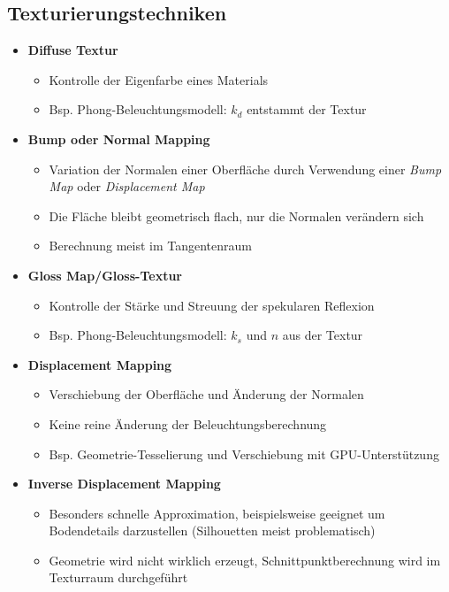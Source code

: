 \subsection{Texturierungstechniken}
\begin{itemize}
	\item \textbf{Diffuse Textur}
	\begin{itemize}
		\item Kontrolle der Eigenfarbe eines Materials
		\item Bsp. Phong-Beleuchtungsmodell: \(k_d\) entstammt der Textur
	\end{itemize}
	\item \textbf{Bump oder Normal Mapping}
	\begin{itemize}
		\item Variation der Normalen einer Oberfläche durch Verwendung einer \textit{Bump Map} oder \textit{Displacement Map}
		\item Die Fläche bleibt geometrisch flach, nur die Normalen verändern sich
		\item Berechnung meist im Tangentenraum
	\end{itemize}
	\item \textbf{Gloss Map/Gloss-Textur}
	\begin{itemize}
		\item Kontrolle der Stärke und Streuung der spekularen Reflexion
		\item Bsp. Phong-Beleuchtungsmodell: \(k_s\) und \(n\) aus der Textur
	\end{itemize}
	\item \textbf{Displacement Mapping}
	\begin{itemize}
		\item Verschiebung der Oberfläche und Änderung der Normalen
		\item Keine reine Änderung der Beleuchtungsberechnung
		\item Bsp. Geometrie-Tesselierung und Verschiebung mit GPU-Unterstützung
	\end{itemize}
	\item \textbf{Inverse Displacement Mapping}
	\begin{itemize}
		\item Besonders schnelle Approximation, beispielsweise geeignet um Bodendetails darzustellen (Silhouetten meist problematisch)
		\item Geometrie wird nicht wirklich erzeugt, Schnittpunktberechnung wird im Texturraum durchgeführt
	\end{itemize}

\end{itemize}
